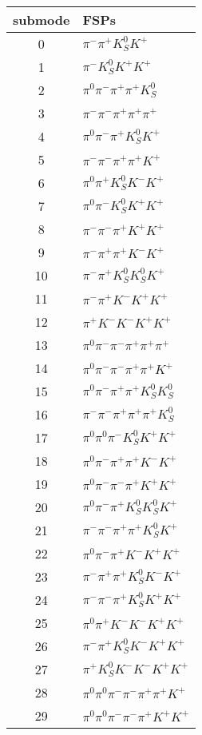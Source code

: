 \begin{table}[h!]
\begin{center}
\begin{tabular}{cl}
\hline
submode& FSPs\\
\hline
0 & $\pi^- \pi^+ K_S^0 K^+ $ \\
1 & $\pi^- K_S^0 K^+ K^+ $ \\
2 & $\pi^0 \pi^- \pi^+ \pi^+ K_S^0 $ \\
3 & $\pi^- \pi^- \pi^+ \pi^+ \pi^+ $ \\
4 & $\pi^0 \pi^- \pi^+ K_S^0 K^+ $ \\
5 & $\pi^- \pi^- \pi^+ \pi^+ K^+ $ \\
6 & $\pi^0 \pi^+ K_S^0 K^- K^+ $ \\
7 & $\pi^0 \pi^- K_S^0 K^+ K^+ $ \\
8 & $\pi^- \pi^- \pi^+ K^+ K^+ $ \\
9 & $\pi^- \pi^+ \pi^+ K^- K^+ $ \\
10 & $\pi^- \pi^+ K_S^0 K_S^0 K^+ $ \\
11 & $\pi^- \pi^+ K^- K^+ K^+ $ \\
12 & $\pi^+ K^- K^- K^+ K^+ $ \\
13 & $\pi^0 \pi^- \pi^- \pi^+ \pi^+ \pi^+ $ \\
14 & $\pi^0 \pi^- \pi^- \pi^+ \pi^+ K^+ $ \\
15 & $\pi^0 \pi^- \pi^+ \pi^+ K_S^0 K_S^0 $ \\
16 & $\pi^- \pi^- \pi^+ \pi^+ \pi^+ K_S^0 $ \\
17 & $\pi^0 \pi^0 \pi^- K_S^0 K^+ K^+ $ \\
18 & $\pi^0 \pi^- \pi^+ \pi^+ K^- K^+ $ \\
19 & $\pi^0 \pi^- \pi^- \pi^+ K^+ K^+ $ \\
20 & $\pi^0 \pi^- \pi^+ K_S^0 K_S^0 K^+ $ \\
21 & $\pi^- \pi^- \pi^+ \pi^+ K_S^0 K^+ $ \\
22 & $\pi^0 \pi^- \pi^+ K^- K^+ K^+ $ \\
23 & $\pi^- \pi^+ \pi^+ K_S^0 K^- K^+ $ \\
24 & $\pi^- \pi^- \pi^+ K_S^0 K^+ K^+ $ \\
25 & $\pi^0 \pi^+ K^- K^- K^+ K^+ $ \\
26 & $\pi^- \pi^+ K_S^0 K^- K^+ K^+ $ \\
27 & $\pi^+ K_S^0 K^- K^- K^+ K^+ $ \\
28 & $\pi^0 \pi^0 \pi^- \pi^- \pi^+ \pi^+ K^+ $ \\
29 & $\pi^0 \pi^0 \pi^- \pi^- \pi^+ K^+ K^+ $ \\

\end{tabular}
\end{center}
\end{table}
